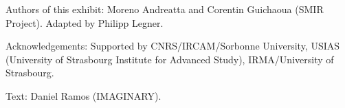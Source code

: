 \begin{sectcredits}
\item[Authors of this exhibit:] Moreno Andreatta and Corentin Guichaoua (SMIR Project). Adapted by Philipp Legner.
\item[Acknowledgements:] Supported by CNRS/IRCAM/Sorbonne University, USIAS (University of Strasbourg Institute for Advanced Study), IRMA/University of Strasbourg.  
\item[Text:] Daniel Ramos (IMAGINARY).
\end{sectcredits}
